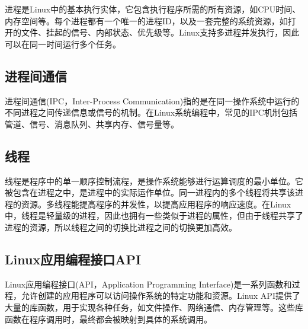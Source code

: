 \documentclass[12pt, a4paper, oneside]{ctexbook}
\numberwithin{figure}{section}
\begin{document}
进程是Linux中的基本执行实体，它包含执行程序所需的所有资源，如CPU时间、内存空间等。每个进程都有一个唯一的进程ID，以及一套完整的系统资源，如打开的文件、挂起的信号、内部状态、优先级等。Linux支持多进程并发执行，因此可以在同一时间运行多个任务。
\begin{figure}[H]
\centering
 \caption{}
 \label{}
\end{figure}
\subsection{进程间通信}
    
进程间通信(IPC，Inter-Process Communication)指的是在同一操作系统中运行的不同进程之间传递信息或信号的机制。在Linux系统编程中，常见的IPC机制包括管道、信号、消息队列、共享内存、信号量等。
    
\subsection{线程}
    
线程是程序中的单一顺序控制流程，是操作系统能够进行运算调度的最小单位。它被包含在进程之中，是进程中的实际运作单位。同一进程内的多个线程将共享该进程的资源。多线程能提高程序的并发性，以提高应用程序的响应速度。在Linux中，线程是轻量级的进程，因此也拥有一些类似于进程的属性，但由于线程共享了进程的资源，所以线程之间的切换比进程之间的切换更加高效。

\subsection{Linux应用编程接口API}

Linux应用编程接口(API，Application Programming Interface)是一系列函数和过程，允许创建的应用程序可以访问操作系统的特定功能和资源。Linux API提供了大量的库函数，用于实现各种任务，如文件操作、网络通信、内存管理等。这些库函数在程序调用时，最终都会被映射到具体的系统调用。
    
\end{document}
